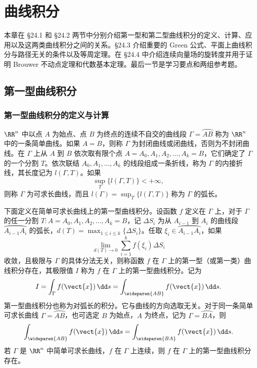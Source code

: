 \chapter{曲线积分}


本章在 §24.1 和 §24.2 两节中分别介绍第一型和第二型曲线积分的定义、计算、应用以及这两类曲线积分之间的关系。§24.3 介绍重要的 Green 公式、平面上曲线积分与路径无关的条件以及等周定理。在 §24.4 中介绍连续向量场的旋转度并用于证明 Brouwer 不动点定理和代数基本定理。最后一节是学习要点和两组参考题。

\section{第一型曲线积分}

\subsection{第一型曲线积分的定义与计算}

$\RR^n$ 中以点 $A$ 为始点、点 $B$ 为终点的连续不自交的曲线段 $\Gamma=\wideparen{AB}$ 称为 $\RR^n$ 中的一条简单曲线。如果 $A=B$，则称 $\Gamma$ 为封闭曲线或闭曲线，否则为不封闭曲线。在 $\Gamma$ 上从 $A$ 到 $B$ 依次取有限个点 $A=A_0,A_1,A_2,\ldots,A_k=B$，它们确定了 $\Gamma$ 的一个分割 $T$。依次联结 $A_0,A_1,\ldots,A_k$ 的线段组成一条折线，称为 $\Gamma$ 的内接折线，其长度记为 $l(\Gamma,T)$。如果
\[
  \sup_T\{l(\Gamma,T)\}<+\infty,
\]
则称 $\Gamma$ 为可求长曲线，而且 $l(\Gamma)=\sup_T\{l(\Gamma,T)\}$ 称为 $\Gamma$ 的弧长。

下面定义在简单可求长曲线上的第一型曲线积分。设函数 $f$ 定义在 $\Gamma$ 上，对于 $\Gamma$ 的任一分割 $T\colon A=A_0,A_1,A_2,\ldots,A_k=B$，记 $\Delta S_i$ 为从 $A_{i-1}$ 到 $A_i$ 的曲线段 $\wideparen{A_{i-1}A_i}$ 的弧长，$d(T)=\max_{1\le i\le k}\{\Delta S_i\}$。任取 $\xi_i\in\wideparen{A_{i-1}A_i}$，如果
\[
  \lim_{d(T)\to0}\sum_{i=1}^k f(\xi_i)\Delta S_i
\]
收敛，且极限与 $\Gamma$ 的具体分法无关，则称函数 $f$ 在 $\Gamma$ 上的第一型（或第一类）曲线积分存在，其极限值 $I$ 称为 $f$ 在 $\Gamma$ 上的第一型曲线积分。记为
\[
  I=\int_\Gamma f(\vect{x})\,\dd s=\int_{\wideparen{AB}}f(\vect{x})\,\dd s.
\]
第一型曲线积分也称为对弧长的积分。它与曲线的方向选取无关。对于同一条简单可求长曲线 $\Gamma=\wideparen{AB}$，也可选定 $B$ 为始点，$A$ 为终点，记为 $\Gamma=\wideparen{BA}$，则
\[
  \int_{\wideparen{AB}}f(\vect{x})\,\dd s=\int_{\wideparen{BA}}f(\vect{x})\,\dd s.
\]
若 $\Gamma$ 是 $\RR^n$ 中简单可求长曲线，$f$ 在 $\Gamma$ 上连续，则 $f$ 在 $\Gamma$ 上的第一型曲线积分存在。

